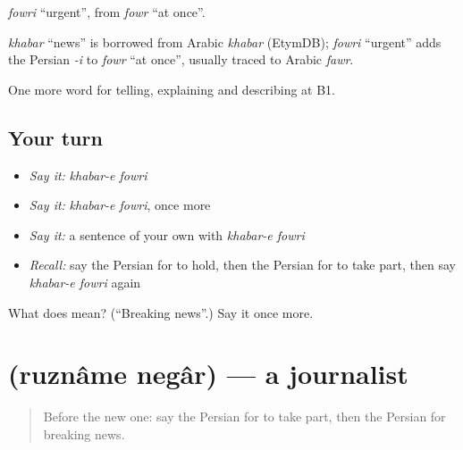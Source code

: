 \emph{fowri} \textquotedblleft{}urgent\textquotedblright{}, from \emph{fowr} \textquotedblleft{}at once\textquotedblright{}.

\begin{cousinweb}
\emph{khabar} \textquotedblleft{}news\textquotedblright{} is borrowed from Arabic \emph{khabar} (EtymDB); \emph{fowri} \textquotedblleft{}urgent\textquotedblright{} adds the Persian \emph{-i} to \emph{fowr} \textquotedblleft{}at once\textquotedblright{}, usually traced to Arabic \emph{fawr}.
\end{cousinweb}

\begin{grammarlens}[title={What you've built}]
One more word for telling, explaining and describing at B1.
\end{grammarlens}

\subsection*{Your turn}
\begin{itemize}
\raggedright
  \item \emph{Say it:} \emph{khabar-e fowri}
  \item \emph{Say it:} \emph{khabar-e fowri}, once more
  \item \emph{Say it:} a sentence of your own with \emph{khabar-e fowri}
  \item \emph{Recall:} say the Persian for to hold, then the Persian for to take part, then say \emph{khabar-e fowri} again
\end{itemize}

\begin{tcolorbox}[breakable,colback=teal!4,colframe=teal!35!black,title={Before you move on}]
What does   mean? (\textquotedblleft{}Breaking news\textquotedblright{}.) Say it once more.
\end{tcolorbox}
\section[\texorpdfstring{\fa{روزنامه} \fa{نگار} (ruznâme negâr)}{روزنامه نگار (ruznâme negâr)}]{  (ruznâme negâr) — a journalist}

\label{lesson:FA-C315-ruzname-negar}



\begin{quote}
Before the new one: say the Persian for to take part, then the Persian for breaking news.
\end{quote}

